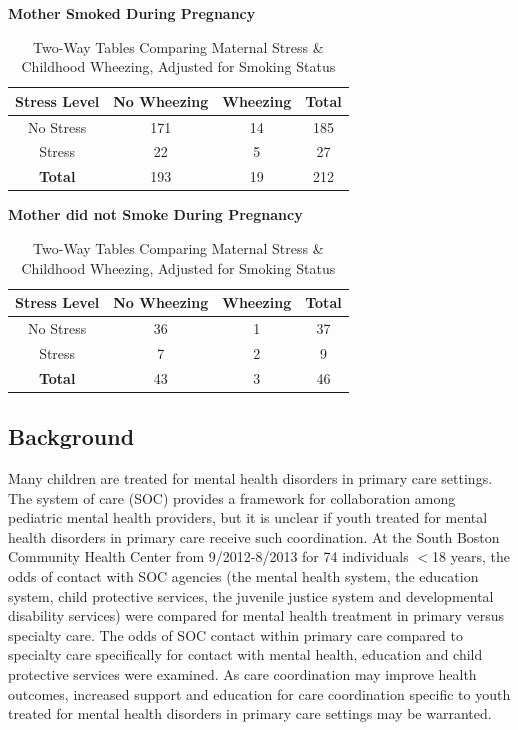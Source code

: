 \documentclass{article}
\begin{document}
	\begin{table}[h]
		\centering
		\footnotesize
		\caption{Two-Way Tables Comparing Maternal Stress \& Childhood Wheezing, Adjusted for Smoking Status}
		\begin{minipage}{0.48\linewidth}
			\centering
			\textbf{Mother Smoked During Pregnancy} \\[2pt]
			\begin{tabular}{cccc} %
				\toprule
				\textbf{Stress Level} & \textbf{No Wheezing} & \textbf{Wheezing} & \textbf{Total} \\
				\midrule
				No Stress & 171 & 14 & 185 \\
				Stress & 22 & 5 & 27 \\
				\midrule
				\textbf{Total} & 193 & 19 & 212 \\
				\bottomrule
			\end{tabular}
		\end{minipage}
		\hfill
		\begin{minipage}{0.48\linewidth}
			\centering
			\textbf{Mother did not Smoke During Pregnancy} \\[2pt]
			\begin{tabular}{cccc} %
				\toprule
				\textbf{Stress Level} & \textbf{No Wheezing} & \textbf{Wheezing} & \textbf{Total} \\
				\midrule
				No Stress & 36 & 1 & 37 \\
				Stress & 7 & 2 & 9 \\
				\midrule
				\textbf{Total} & 43 & 3 & 46 \\
				\bottomrule
			\end{tabular}
		\end{minipage}
	\end{table}

	\newpage
	\subsection*{Background}

	Many children are treated for mental health disorders in primary care settings.  The system of care (SOC) provides a framework for collaboration among pediatric mental health providers, but it is unclear if youth treated for mental health disorders in primary care receive such coordination.  At the South Boston Community Health Center from 9/2012-8/2013 for 74 individuals $<$18 years, the odds of contact with SOC agencies (the mental health system, the education system, child protective services, the juvenile justice system and developmental disability services) were compared for mental health treatment in primary versus specialty care.  The odds of SOC contact within primary care compared to specialty care specifically for contact with mental health, education and child protective services were examined.  As care coordination may improve health outcomes, increased support and education for care coordination specific to youth treated for mental health disorders in primary care settings may be warranted.
	
\end{document}
